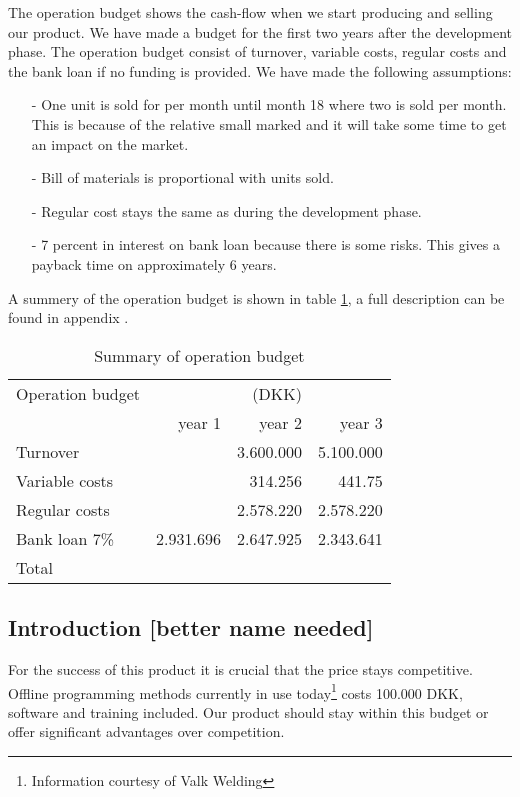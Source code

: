 The operation budget shows the cash-flow when we start producing and selling our product. We have made a budget for the first two years after the development phase. The operation budget consist of turnover, variable costs, regular costs and the bank loan if no funding is provided. We have made the following assumptions:
\begin{itemize}
\item[-] One unit is sold for per month until month 18 where two is sold per month. This is because of the relative small marked and it will take some time to get an impact on the market.
\item[-] Bill of materials is proportional with units sold.
\item[-] Regular cost stays the same as during the development phase.
\item[-] 7 percent in interest on bank loan because there is some risks. This gives a payback time on approximately 6 years.
\end{itemize}
A summery of the operation budget is shown in table \ref{opebud}, a full description can be found in appendix .
\begin{table}[h!]
\label{opebud}
\centering
\begin{tabular}{l r r r}
Operation budget						& 				&\hfill(DKK)\\
						&	year 1		& year 2		& year 3 \\
\hline
Turnover				&				& 3.600.000		& 5.100.000 \\
Variable costs	  		&				& 314.256		& 441.75 \\
Regular costs			&			  	& 2.578.220 	& 2.578.220	 \\
Bank loan 7\%			& 2.931.696 	& 2.647.925 	& 2.343.641\\

\hline
Total         							&   			&\\
\end{tabular}
\caption{Summary of operation budget}
\end{table}

\subsection{Introduction [better name needed]}
For the success of this product it is crucial that the price stays competitive. Offline programming methods currently in use today\footnote{Information courtesy of Valk Welding} costs 100.000 DKK, software and training included. Our product should stay within this budget or offer significant advantages over competition.
